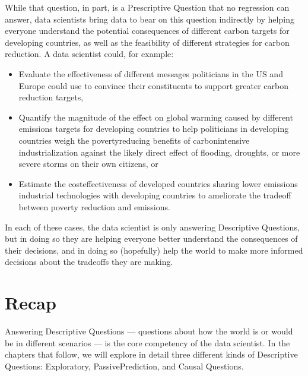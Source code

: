 \documentclass[letterpaper,10pt,english]{jupyterBook}
\begin{document}
\sphinxAtStartPar
While that question, in part, is a Prescriptive Question that no regression can answer, data scientists  bring data to bear on this question indirectly by helping everyone understand the potential consequences of different carbon targets for developing countries, as well as the feasibility of different strategies for carbon reduction. A data scientist could, for example:
\begin{itemize}
\item {} 
\sphinxAtStartPar
Evaluate the effectiveness of different messages politicians in the US and Europe could use to convince their constituents to support greater carbon reduction targets,

\item {} 
\sphinxAtStartPar
Quantify the magnitude of the effect on global warming caused by different emissions targets for developing countries to help politicians in developing countries weigh the poverty\sphinxhyphen{}reducing benefits of carbon\sphinxhyphen{}intensive industrialization against the likely direct effect of flooding, droughts, or more severe storms on their own citizens, or

\item {} 
\sphinxAtStartPar
Estimate the cost\sphinxhyphen{}effectiveness of developed countries sharing lower emissions industrial technologies with developing countries to ameliorate the tradeoff between poverty reduction and emissions.

\end{itemize}

\sphinxAtStartPar
In each of these cases, the data scientist is only answering Descriptive Questions, but in doing so they are helping everyone better understand the consequences of their decisions, and in doing so (hopefully) help the world to make more informed decisions about the trade\sphinxhyphen{}offs they are making.


\section{Recap}
\label{\detokenize{30_questions/05_descriptive_v_prescriptive:recap}}
\sphinxAtStartPar
Answering Descriptive Questions — questions about how the world is or would be in different scenarios — is the core competency of the data scientist. In the chapters that follow, we will explore in detail three different kinds of Descriptive Questions: Exploratory, Passive\sphinxhyphen{}Prediction, and Causal Questions.
\end{document}
